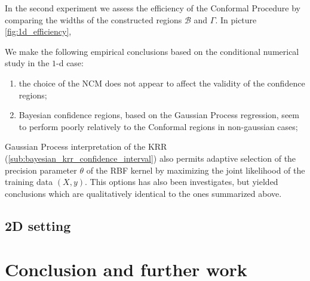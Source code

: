 \documentclass{ITaSconf}
\newcommand{\Bcal}{\mathcal{B}}
\begin{document}
In the second experiment we assess the efficiency of the Conformal Procedure by
comparing the widths of the constructed regions $\Bcal$ and $\Gamma$. In picture
\ref{fig:1d_efficiency}, 

We make the following empirical conclusions based on the conditional numerical study
in the $1$-d case: \begin{enumerate}
  \item the choice of the NCM does not appear to affect the validity of the confidence
  regions;
  \item Bayesian confidence regions, based on the Gaussian Process regression, seem
  to perform poorly relatively to the Conformal regions in non-gaussian cases;

\end{enumerate}

Gaussian Process interpretation of the KRR (\ref{sub:bayesian_krr_confidence_interval}) also
permits adaptive selection of the precision parameter $\theta$ of the RBF kernel
by maximizing the joint likelihood of the training data $(X, y)$. This options has
also been investigates, but yielded conclusions which are qualitatively identical
to the ones summarized above.


\subsection{2D setting} %
\label{sub:2d_setting}



\section{Conclusion and further work} %
\label{sec:conclusion_and_further_work}

\end{document}
